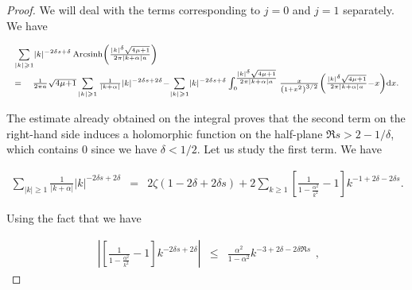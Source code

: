 \documentclass{jams-l}
\theoremstyle{definition}
\theoremstyle{remark}
\numberwithin{equation}{section}
\DeclareMathOperator{\arcsinh}{Arcsinh}
\begin{document}
\begin{proof}
                \noindent We will deal with the terms corresponding to $j=0$ and $j=1$ separately. We have
                
                \[ \begin{array}{ll}
                        \multicolumn{2}{l}{\scriptstyle \sum\limits_{\left \vert k \right \vert \geqslant 1}  \left \vert k \right \vert^{-2 \delta s + \delta} \arcsinh \left( \frac{\left \vert k \right \vert^{\delta} \sqrt{4 \mu + 1}}{2 \pi \left \vert k + \alpha \right \vert a} \right)} \\[0.6em]
                        
                        \scriptstyle = & \scriptstyle \frac{1}{2 \pi a} \sqrt{4 \mu + 1} \sum\limits_{\left \vert k \right \vert \geqslant 1} \frac{1}{\left \vert k + \alpha \right \vert} \left \vert k \right \vert^{-2 \delta s + 2 \delta} - \sum\limits_{\left \vert k \right \vert \geqslant 1}  \left \vert k \right \vert^{-2 \delta s + \delta} \int_0^{\frac{\left \vert k \right \vert^{\delta} \sqrt{4 \mu + 1}}{2 \pi \left \vert k + \alpha \right \vert a}} \frac{x}{\left( 1 + x^2 \right)^{3/2}} \left( \frac{\left \vert k \right \vert^{\delta} \sqrt{4 \mu + 1}}{2 \pi \left \vert k + \alpha \right \vert a} - x \right) \mathrm{d}x.
                    \end{array} \]
                
                \noindent The estimate already obtained on the integral proves that the second term on the right-hand side induces a holomorphic function on the half-plane $\Re s > 2 - 1/\delta$, which contains $0$ since we have $\delta < 1/2$. Let us study the first term. We have
                
                \[ \begin{array}{lll}
                        \sum\limits_{\left \vert k \right \vert \geqslant 1} \frac{1}{\left \vert k + \alpha \right \vert} \left \vert k \right \vert^{-2 \delta s + 2 \delta} & = & 2 \zeta \left( 1 - 2 \delta + 2 \delta s \right) + 2 \sum\limits_{k \geqslant 1} \left[ \frac{1}{1 - \frac{\alpha^2}{k^2}} - 1 \right] k^{-1+2\delta - 2 \delta s}.
                    \end{array} \]
                
                \noindent Using the fact that we have
                
                \[ \begin{array}{lll}
                        \left \vert \left[ \frac{1}{1 - \frac{\alpha^2}{k^2}} - 1 \right] k^{- 2 \delta s + 2 \delta} \right \vert & \leqslant & \frac{\alpha^2}{1 - \alpha^2} k^{- 3 + 2 \delta - 2 \delta \Re s}
                    \end{array} , \]
                

\end{proof}
\end{document}
